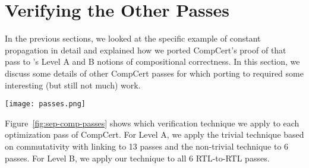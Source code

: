 \section{Verifying the Other Passes}

In the previous sections, we looked at the specific example of
constant propagation in detail and explained how we ported CompCert's
proof of that pass to \sepcomp{}'s Level A and B notions of
compositional correctness.  In this section, we discuss some details
of other CompCert passes for which porting to \sepcomp{} required some
interesting (but still not much) work.

\begin{figure*}[t]
\begin{center}
\texttt{[image: passes.png]}
\end{center}
\caption{Optimization passes of \sepcomp{} Level A and Level B.}
\label{fig:sep-comp-passes}
\end{figure*}

Figure~\ref{fig:sep-comp-passes} shows which verification technique we
apply to each optimization pass of CompCert.  For Level A, we apply
the trivial technique based on commutativity with linking to 13 passes
and the non-trivial technique to 6 passes.  For Level B, we apply our
technique to all 6 RTL-to-RTL passes.




